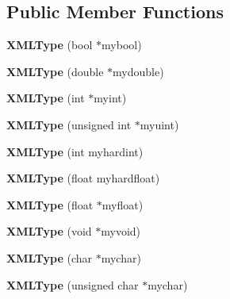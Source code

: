 \subsection*{Public Member Functions}
\begin{DoxyCompactItemize}
\item 
{\bfseries X\+M\+L\+Type} (bool $\ast$mybool)\hypertarget{structXMLType_af84db286d323dbd16c04205a3fa9407c}{}\label{structXMLType_af84db286d323dbd16c04205a3fa9407c}

\item 
{\bfseries X\+M\+L\+Type} (double $\ast$mydouble)\hypertarget{structXMLType_ab6568302a6fac51d47c40d96eaf50f22}{}\label{structXMLType_ab6568302a6fac51d47c40d96eaf50f22}

\item 
{\bfseries X\+M\+L\+Type} (int $\ast$myint)\hypertarget{structXMLType_a967b66641da9ee46eacd9eca5719df23}{}\label{structXMLType_a967b66641da9ee46eacd9eca5719df23}

\item 
{\bfseries X\+M\+L\+Type} (unsigned int $\ast$myuint)\hypertarget{structXMLType_af6524245bd2d2ea2578e4d98a7d90eb3}{}\label{structXMLType_af6524245bd2d2ea2578e4d98a7d90eb3}

\item 
{\bfseries X\+M\+L\+Type} (int myhardint)\hypertarget{structXMLType_af05a7e14921947eb712dfcc0fd4c6678}{}\label{structXMLType_af05a7e14921947eb712dfcc0fd4c6678}

\item 
{\bfseries X\+M\+L\+Type} (float myhardfloat)\hypertarget{structXMLType_a0920a532a4dbf3663a0f5a3ddbb91a42}{}\label{structXMLType_a0920a532a4dbf3663a0f5a3ddbb91a42}

\item 
{\bfseries X\+M\+L\+Type} (float $\ast$myfloat)\hypertarget{structXMLType_ad2e056093c17588a23b4657eae237db3}{}\label{structXMLType_ad2e056093c17588a23b4657eae237db3}

\item 
{\bfseries X\+M\+L\+Type} (void $\ast$myvoid)\hypertarget{structXMLType_a84cda5a848c43980992fd18b8cf3485f}{}\label{structXMLType_a84cda5a848c43980992fd18b8cf3485f}

\item 
{\bfseries X\+M\+L\+Type} (char $\ast$mychar)\hypertarget{structXMLType_a05ac833ad960e4374e41c4ad37ac75c0}{}\label{structXMLType_a05ac833ad960e4374e41c4ad37ac75c0}

\item 
{\bfseries X\+M\+L\+Type} (unsigned char $\ast$mychar)\hypertarget{structXMLType_a3fe0f2cf0b965a9301ffc5270617d23f}{}\label{structXMLType_a3fe0f2cf0b965a9301ffc5270617d23f}


\end{DoxyCompactItemize}
